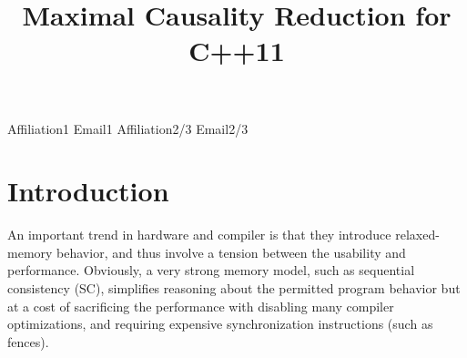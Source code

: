 \documentclass[preprint, numbers, 10pt]{sigplanconf}
\begin{document}
\setlength{\pdfpageheight}{\paperheight}
\setlength{\pdfpagewidth}{\paperwidth}




\title{Maximal Causality Reduction for C++11}

           {Affiliation1}
           {Email1}
           {Affiliation2/3}
           {Email2/3}

\maketitle

\begin{abstract}

\end{abstract}




%
%
%
%
%
%

\section{Introduction}

An important trend in hardware and compiler is that 
they introduce relaxed-memory behavior, and thus involve 
a tension between the usability and performance. 
Obviously, a very strong memory model, such as sequential 
consistency (SC), simplifies reasoning about the permitted 
program behavior but at a cost of sacrificing the performance 
with disabling many compiler optimizations, and requiring
expensive synchronization instructions (such as fences). 
\end{document}
